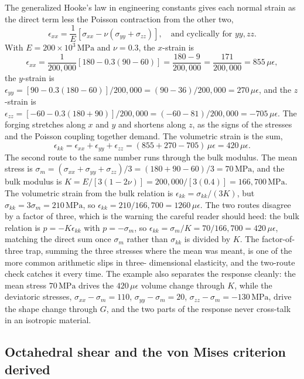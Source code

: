 The generalized Hooke's law in engineering constants gives each normal
strain as the direct term less the Poisson contraction from the other
two,
\[
\epsilon_{xx} = \frac{1}{E}\left[\sigma_{xx} - \nu(\sigma_{yy} +
\sigma_{zz})\right], \quad \text{and cyclically for } yy, zz.
\]
With $E = 200\times 10^3\,\text{MPa}$ and $\nu = 0.3$, the $x$-strain is
\[
\epsilon_{xx} = \frac{1}{200{,}000}\left[180 - 0.3(90 - 60)\right] =
\frac{180 - 9}{200{,}000} = \frac{171}{200{,}000} = 855\,\mu\epsilon,
\]
the $y$-strain is $\epsilon_{yy} = [90 - 0.3(180 - 60)]/200{,}000 =
(90 - 36)/200{,}000 = 270\,\mu\epsilon$, and the $z$-strain is
$\epsilon_{zz} = [-60 - 0.3(180 + 90)]/200{,}000 = (-60 - 81)/200{,}000 =
-705\,\mu\epsilon$. The forging stretches along $x$ and $y$ and shortens
along $z$, as the signs of the stresses and the Poisson coupling
together demand. The volumetric strain is the sum,
\[
\epsilon_{kk} = \epsilon_{xx} + \epsilon_{yy} + \epsilon_{zz} =
(855 + 270 - 705)\,\mu\epsilon = 420\,\mu\epsilon.
\]
The second route to the same number runs through the bulk modulus. The
mean stress is $\sigma_m = (\sigma_{xx} + \sigma_{yy} + \sigma_{zz})/3 =
(180 + 90 - 60)/3 = 70\,\text{MPa}$, and the bulk modulus is $K =
E/[3(1-2\nu)] = 200{,}000/[3(0.4)] = 166{,}700\,\text{MPa}$. The
volumetric strain from the bulk relation is $\epsilon_{kk} = \sigma_{kk}
/(3K)$, but $\sigma_{kk} = 3\sigma_m = 210\,\text{MPa}$, so $\epsilon_{kk}
= 210/166{,}700 = 1260\,\mu\epsilon$. The two routes disagree by a factor
of three, which is the warning the careful reader should heed: the bulk
relation is $p = -K\epsilon_{kk}$ with $p = -\sigma_m$, so
$\epsilon_{kk} = \sigma_m/K = 70/166{,}700 = 420\,\mu\epsilon$, matching
the direct sum once $\sigma_m$ rather than $\sigma_{kk}$ is divided by
$K$. The factor-of-three trap, summing the three stresses where the mean
was meant, is one of the more common arithmetic slips in three-
dimensional elasticity, and the two-route check catches it every time.
The example also separates the response cleanly: the mean stress
$70\,\text{MPa}$ drives the $420\,\mu\epsilon$ volume change through $K$,
while the deviatoric stresses, $\sigma_{xx} - \sigma_m = 110$, $\sigma_
{yy} - \sigma_m = 20$, $\sigma_{zz} - \sigma_m = -130\,\text{MPa}$, drive
the shape change through $G$, and the two parts of the response never
cross-talk in an isotropic material.

\subsection{Octahedral shear and the von Mises criterion derived}

